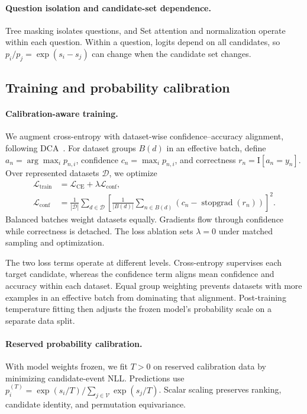 \paragraph{Question isolation and candidate-set dependence.}
Tree masking isolates questions, and Set attention and normalization operate within each question. Within a question, logits depend on all candidates, so $p_i/p_j=\exp(s_i-s_j)$ can change when the candidate set changes.

\subsection{Training and probability calibration}
\paragraph{Calibration-aware training.}
We augment cross-entropy with dataset-wise confidence--accuracy alignment, following DCA~\citep{liang_2020_dca}. For dataset groups $B(d)$ in an effective batch, define $a_n=\arg\max_i p_{n,i}$, confidence $c_n=\max_i p_{n,i}$, and correctness $r_n=\mathrm{I}[a_n=y_n]$. Over represented datasets $\mathcal D$, we optimize
\begin{equation}
\begin{aligned}
\mathcal L_{\mathrm{train}}&=\mathcal L_{\mathrm{CE}}+\lambda\mathcal L_{\mathrm{conf}},\\
\mathcal L_{\mathrm{conf}}&=\frac{1}{|\mathcal D|}\sum_{d\in\mathcal D}
\left[\frac{1}{|B(d)|}\sum_{n\in B(d)}\left(c_n-\operatorname{stopgrad}(r_n)\right)\right]^2.
\end{aligned}
\label{eq:training-objective}
\end{equation} Balanced batches weight datasets equally. Gradients flow through confidence while correctness is detached. The loss ablation sets $\lambda=0$ under matched sampling and optimization.

The two loss terms operate at different levels. Cross-entropy supervises each target candidate, whereas the confidence term aligns mean confidence and accuracy within each dataset. Equal group weighting prevents datasets with more examples in an effective batch from dominating that alignment. Post-training temperature fitting then adjusts the frozen model's probability scale on a separate data split.

\paragraph{Reserved probability calibration.}
With model weights frozen, we fit $T>0$ on reserved calibration data by minimizing candidate-event NLL. Predictions use $p_i^{(T)}=\exp(s_i/T)/\sum_{j\in\mathcal V}\exp(s_j/T)$. Scalar scaling preserves ranking, candidate identity, and permutation equivariance.
